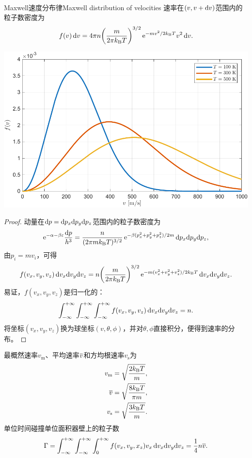 \begin{theorem}
	{Maxwell速度分布律}{Maxwell distribution of velocities}
	速率在$(v,v+\mathop{}\!\mathrm{d} v)$范围内的粒子数密度为
	\begin{equation}
		f(v)\mathop{}\!\mathrm{d} v=4\pi n\biggl(\frac m{2\pi k_{\mathrm B} T}\biggr)^{3/2}\mathop{}\!\mathrm{e}^{-mv^2/2k_{\mathrm B} T}v^2\mathop{}\!\mathrm{d} v.
	\end{equation}
	\begin{center}
		\includegraphics[width=0.8\linewidth]{figures/Maxwell_distribution.pdf}
		\label{fig:Maxwell distribution}
	\end{center}
\end{theorem}

\begin{proof}
	动量在$\mathop{}\!\mathrm{d} p=\mathop{}\!\mathrm{d} p_x\mathrm{d} p_y\mathrm{d} p_z$范围内的粒子数密度为
	\[
		\mathop{}\!\mathrm{e}^{-\alpha-\beta\varepsilon}\frac{\mathop{}\!\mathrm{d} p}{h^3}=\frac n{(2\pi mk_{\mathrm B} T)^{3/2}}\mathop{}\!\mathrm{e}^{-\beta(p_x^2+p_y^2+p_z^2)/2m}\mathop{}\!\mathrm{d} p_x\mathrm{d} p_y\mathrm{d} p_z,
	\]
	由$p_i=mv_i$，可得
	\begin{equation}
		f(v_x,v_y,v_z)\mathop{}\!\mathrm{d} v_x\mathrm{d} v_y\mathrm{d} v_z=n\biggl(\frac m{2\pi k_{\mathrm B} T}\biggr)^{3/2}\mathop{}\!\mathrm{e}^{-m(v_x^2+v_y^2+v_z^2)/2k_{\mathrm B} T}\mathop{}\!\mathrm{d} v_x\mathrm{d} v_y\mathrm{d} v_z.
	\end{equation}
	易证，$f(v_x,v_y,v_z)$是归一化的：
	\[
		\int_{-\infty}^{+\infty}\int_{-\infty}^{+\infty}\int_{-\infty}^{+\infty} f(v_x,v_y,v_z)\mathop{}\!\mathrm{d} v_x\mathrm{d} v_y\mathrm{d} v_z=n.
	\]
	将坐标$(v_x,v_y,v_z)$换为球坐标$(v,\theta,\phi)$，并对$\theta,\phi$直接积分，便得到速率的分布。
\end{proof}

\begin{corollary}
	最概然速率$v_\mathrm m$、平均速率$\overline{v}$和方均根速率$v_\mathrm s$为
	\begin{subequations}
		\begin{align}
			v_\mathrm m&=\sqrt{\frac{2k_{\mathrm B} T}m},\\
			\overline{v}&=\sqrt{\frac{8k_{\mathrm B} T}{\pi m}},\\
			v_\mathrm s&=\sqrt{\frac{3k_{\mathrm B} T}m}.
		\end{align}
	\end{subequations}
	单位时间碰撞单位面积器壁上的粒子数
	\begin{equation}
		\Gamma=\int_{-\infty}^{+\infty}\int_{-\infty}^{+\infty}\int_0^{+\infty} f(v_x,v_y,x_z) v_x\mathop{}\!\mathrm{d} v_x\mathrm{d} v_y\mathrm{d} v_z=\frac14n\overline{v}.
	\end{equation}
\end{corollary}

